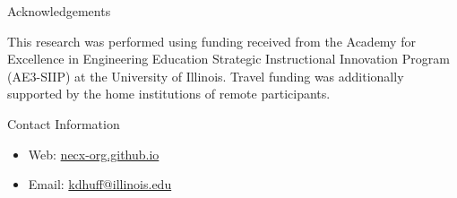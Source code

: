 \documentclass[final]{beamer}
\newlength{\onecolwid}
\newlength{\threecolwid}
\begin{document}
\begin{frame}[t]
\begin{columns}[t,totalwidth=\threecolwid]
\begin{column}{\onecolwid}

\begin{block}{Acknowledgements}
	
	This research was performed using funding received
	from the Academy for Excellence in Engineering Education Strategic 
        Instructional Innovation Program (AE3-SIIP) at the University of 
        Illinois. Travel funding was additionally supported by the home 
        institutions of remote participants.
	
	
\end{block}






\begin{alertblock}{Contact Information}
	\begin{itemize}
		
		\item Web: \href{necx-org.github.io}{necx-org.github.io}
		\item Email: \href{mailto:kdhuff@illinois.edu}{kdhuff@illinois.edu}
	\end{itemize}
	
\end{alertblock}
    



\end{column} %

\end{columns} %

\end{frame} %
\end{document}

